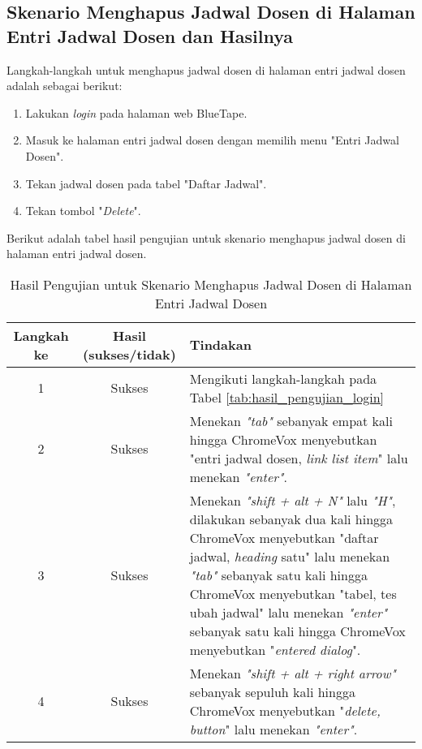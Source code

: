 \subsection{Skenario Menghapus Jadwal Dosen di Halaman Entri Jadwal Dosen dan Hasilnya}
\label{subsec:skenario_menghapus_jadwal_dosen_di_halaman_entri_jadwal_dosen}
Langkah-langkah untuk menghapus jadwal dosen di halaman entri jadwal dosen adalah sebagai berikut:

\begin{enumerate}
    \item Lakukan \textit{login} pada halaman web BlueTape.
    \item Masuk ke halaman entri jadwal dosen dengan memilih menu "Entri Jadwal Dosen".
    \item Tekan jadwal dosen pada tabel "Daftar Jadwal".
    \item Tekan tombol "\textit{Delete}".
\end{enumerate}

Berikut adalah tabel hasil pengujian untuk skenario menghapus jadwal dosen di halaman entri jadwal dosen.

\begin{table}[H]
    \centering 
    \caption{Hasil Pengujian untuk Skenario Menghapus Jadwal Dosen di Halaman Entri Jadwal Dosen}
    \label{tab:hasil_pengujian_menghapus_jadwal_dosen_di_halaman_entri_jadwal_dosen}
    \begin{tabular}{|c|c|p{10cm}|}
        \toprule
        Langkah ke & Hasil (sukses/tidak) & Tindakan \\

        \midrule
        1 & Sukses & Mengikuti langkah-langkah pada Tabel \ref{tab:hasil_pengujian_login} \\
        2 & Sukses & Menekan \textit{"tab"} sebanyak empat kali hingga ChromeVox menyebutkan "entri jadwal dosen, \textit{link list item}" lalu menekan \textit{"enter"}. \\
        3 & Sukses & Menekan \textit{"shift + alt + N"} lalu \textit{"H"}, dilakukan sebanyak dua kali hingga ChromeVox menyebutkan "daftar jadwal, \textit{heading} satu" lalu menekan \textit{"tab"} sebanyak satu kali hingga ChromeVox menyebutkan "tabel, tes ubah jadwal" lalu menekan \textit{"enter"} sebanyak satu kali hingga ChromeVox menyebutkan "\textit{entered dialog}". \\
        4 & Sukses & Menekan \textit{"shift + alt + right arrow"} sebanyak sepuluh kali hingga ChromeVox menyebutkan "\textit{delete, button}" lalu menekan \textit{"enter"}. \\

        \bottomrule

    \end{tabular}
\end{table}

